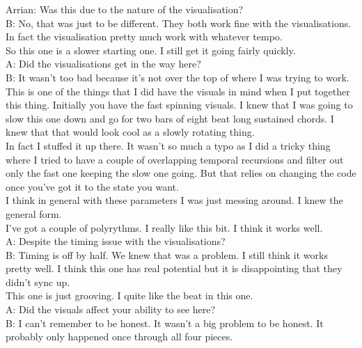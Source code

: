 \documentclass[12pt]{article}
\begin{document}
Arrian: Was this due to the nature of the visualisation?\\

B: No, that was just to be different. They both work fine with the visualisations. In fact the visualisation pretty much work with whatever tempo.\\

So this one is a slower starting one. I still get it going fairly quickly.\\

A: Did the visualisations get in the way here?\\

B: It wasn't too bad because it's not over the top of where I was trying to work.\\

This is one of the things that I did have the visuals in mind when I put together this thing. Initially you have the fast spinning visuals. I knew that I was going to slow this one down and go for two bars of eight beat long sustained chords. I knew that that would look cool as a slowly rotating thing.\\

In fact I stuffed it up there. It wasn't so much a typo as I did a tricky thing where I tried to have a couple of overlapping temporal recursions and filter out only the fast one keeping the slow one going. But that relies on changing the code once you've got it to the state you want.\\

I think in general with these parameters I was just messing around. I knew the general form.\\

I've got a couple of polyrythms. I really like this bit. I think it works well.\\

A: Despite the timing issue with the visualisations?\\

B: Timing is off by half. We knew that was a problem. I still think it works pretty well. I think this one has real potential but it is disappointing that they didn't sync up.\\

This one is just grooving. I quite like the beat in this one.\\

A: Did the visuals affect your ability to see here?\\

B: I can't remember to be honest. It wasn't a big problem to be honest. It probably only happened once through all four pieces.\\
\end{document}
